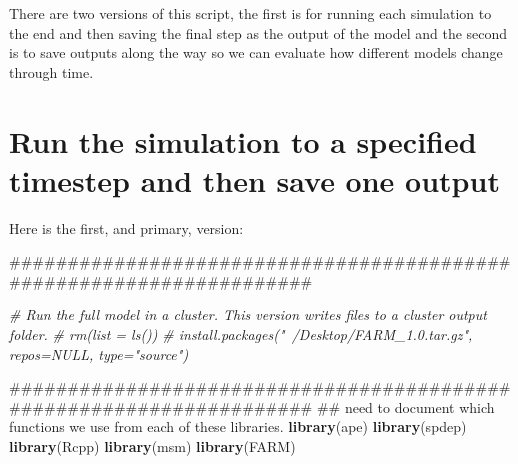 \documentclass[]{book}
\newenvironment{Shaded}{\begin{snugshade}}{\end{snugshade}}
\newcommand{\KeywordTok}[1]{\textcolor[rgb]{0.13,0.29,0.53}{\textbf{{#1}}}}
\newcommand{\CommentTok}[1]{\textcolor[rgb]{0.56,0.35,0.01}{\textit{{#1}}}}
\newcommand{\NormalTok}[1]{{#1}}
\theoremstyle{definition}
\theoremstyle{definition}
\theoremstyle{definition}
\theoremstyle{remark}
\begin{document}
There are two versions of this script, the first is for running each
simulation to the end and then saving the final step as the output of
the model and the second is to save outputs along the way so we can
evaluate how different models change through time.

\section{Run the simulation to a specified timestep and then save one
output}\label{run-the-simulation-to-a-specified-timestep-and-then-save-one-output}

Here is the first, and primary, version:

\begin{Shaded}
\begin{Highlighting}[]
\NormalTok{#####################################################################}

\CommentTok{# Run the full model in a cluster. This version writes files to a cluster output folder.}
\CommentTok{# rm(list = ls())}
\CommentTok{# install.packages("~/Desktop/FARM_1.0.tar.gz", repos=NULL, type="source")}


\NormalTok{#####################################################################}
\NormalTok{## need to document which functions we use from each of these libraries. }
\KeywordTok{library}\NormalTok{(ape)}
\KeywordTok{library}\NormalTok{(spdep)}
\KeywordTok{library}\NormalTok{(Rcpp)}
\KeywordTok{library}\NormalTok{(msm)}
\KeywordTok{library}\NormalTok{(FARM)}



\end{Highlighting}
\end{Shaded}
\end{document}
